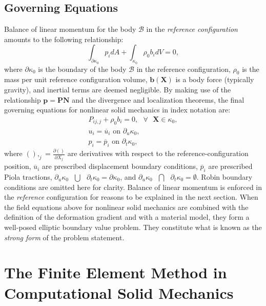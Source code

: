 \subsection{Governing Equations}
Balance of linear momentum for the body $\mathcal{B}$ in the \textit{reference configuration} amounts to the following relationship:
\begin{equation}
\int_{\partial \kappa_0}{p_i}dA + \int_{\kappa_0}\rho_0{b}_idV = 0,
\end{equation}
where $\partial \kappa_0$ is the boundary of the body $\mathcal{B}$ in the reference configuration, $\rho_0$ is the mass per unit reference configuration volume, $\bm{b}(\bm{X})$ is a body force (typically gravity), and inertial terms are deemed negligible. By making use of the relationship $\bm{p} = \bm{P}\bm{N}$ and the divergence and localization theorems, the final governing equations for nonlinear solid mechanics in index notation are:
\begin{gather}
P_{ij,j} + \rho_0b_i = 0, \text{\ \ } \forall \text{\ \ } \bm{X} \in \kappa_0, \label{eqn:equilibrium} \\
{u_i} = \overline{{u}}_i \text{\ \ on\ \ } \partial_u\kappa_0, \\
{p_i} = \overline{{p}}_i\text{\ \ on\ \ } \partial_t\kappa_0,
\end{gather}
where $(),_j = \frac{\partial()}{\partial {{X_j}}}$ are derivatives with respect to the reference-configuration position, $\overline{{u}}_i$ are prescribed displacement boundary conditions, ${\overline{p}_i}$ are prescribed Piola tractions, $\partial_u\kappa_0 \text{\ }\bigcup\text{\ } \partial_t\kappa_0 = \partial\kappa_0$, and $\partial_u\kappa_0 \text{\ }\bigcap\text{\ } \partial_t\kappa_0 = \emptyset$. Robin boundary conditions are omitted here for clarity. Balance of linear momentum is enforced in the \textit{reference} configuration for reasons to be explained in the next section. When the field equations above for nonlinear solid mechanics are combined with the definition of the deformation gradient and with a material model, they form a well-posed elliptic boundary value problem. They constitute what is known as the \textit{strong form} of the problem statement.

\section{The Finite Element Method in Computational Solid Mechanics}
\label{The Finite Element Method in Computational Solid Mechanics}

